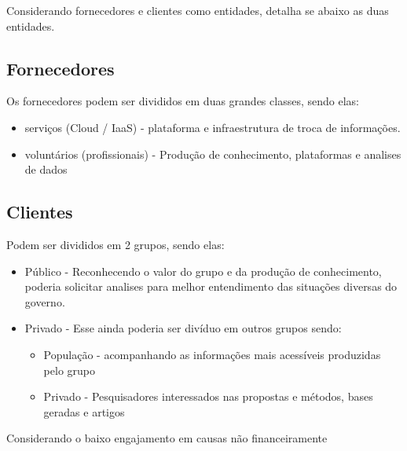 \documentclass[journal]{IEEEtran}
\begin{document}
Considerando fornecedores e clientes como entidades, detalha se abaixo as duas entidades.
\subsection{Fornecedores}
Os fornecedores podem ser divididos em duas grandes classes, sendo elas:
\begin{itemize}
    \item serviços (Cloud / IaaS) - plataforma e infraestrutura de troca de informações.
    \item voluntários (profissionais) - Produção de conhecimento, plataformas e analises de dados
\end{itemize}

\subsection{Clientes}
Podem ser divididos em 2 grupos, sendo elas:
\begin{itemize}
    \item Público - Reconhecendo o valor do grupo e da produção de conhecimento, poderia solicitar analises para melhor entendimento das situações diversas do governo.
    \item Privado - Esse ainda poderia ser divíduo em outros grupos sendo:
    \begin{itemize}
    \item População - acompanhando as informações mais acessíveis produzidas pelo grupo
    \item Privado - Pesquisadores interessados nas propostas e métodos, bases geradas e artigos
    \end{itemize}
\end{itemize}
Considerando o baixo engajamento em causas não financeiramente 






\end{document}
